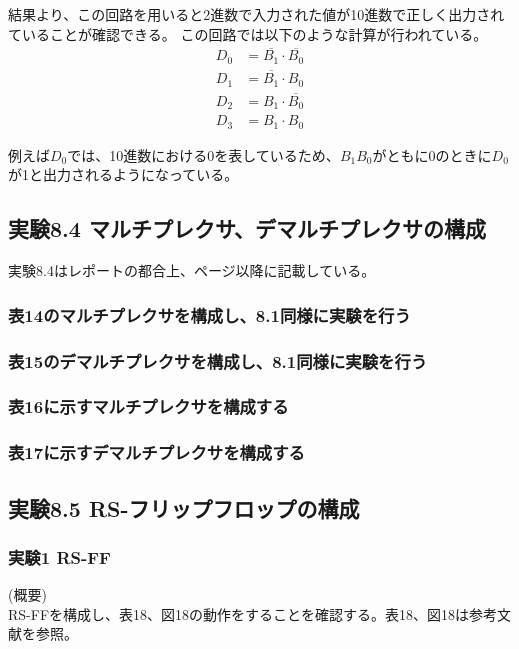 \documentclass[dvipdfmx]{jsarticle}
\begin{document}
結果より、この回路を用いると2進数で入力された値が10進数で正しく出力されていることが確認できる。
この回路では以下のような計算が行われている。\\
\begin{align*}
  D_0 &= \overline{B_1} \cdot \overline{B_0}\\
  D_1 &= \overline{B_1} \cdot B_0\\
  D_2 &= B_1 \cdot \overline{B_0}\\
  D_3 &= B_1 \cdot B_0
\end{align*}

例えば$D_0$では、10進数における0を表しているため、$B_1$$B_0$がともに0のときに$D_0$が1と出力されるようになっている。

\subsection{実験8.4 マルチプレクサ、デマルチプレクサの構成}
実験8.4はレポートの都合上、ページ\pageref*{Aiu}以降に記載している。

\subsubsection{表14のマルチプレクサを構成し、8.1同様に実験を行う}

\subsubsection{表15のデマルチプレクサを構成し、8.1同様に実験を行う}

\subsubsection{表16に示すマルチプレクサを構成する}

\subsubsection{表17に示すデマルチプレクサを構成する}

\newpage

\subsection{実験8.5 RS-フリップフロップの構成}

\subsubsection{実験1 RS-FF}
(概要)\\
RS-FFを構成し、表18、図18の動作をすることを確認する。表18、図18は参考文献を参照。
\end{document}
